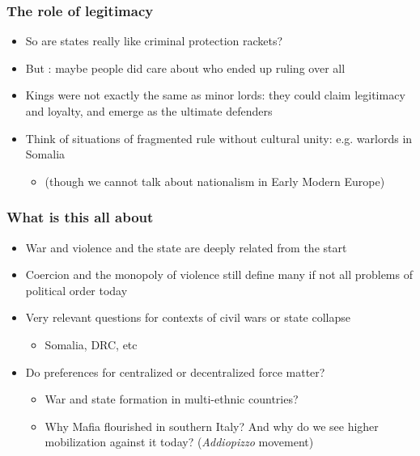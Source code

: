 \documentclass[aspectratio=43, handout]{beamer}
\begin{document}
\begin{frame}
\frametitle{The role of legitimacy}
\centering

\begin{itemize}
  \item So are states really like criminal protection rackets? %
  \item But : maybe people did care about who ended up ruling over all
  \item Kings were not exactly the same as minor lords: they could claim legitimacy and loyalty, and emerge as the ultimate defenders
  \item Think of situations of fragmented rule without cultural unity: e.g. warlords in Somalia
  \begin{itemize}
    \item (though we cannot talk about nationalism in Early Modern Europe)
  \end{itemize}
\end{itemize}

\end{frame}

\begin{frame}
\frametitle{What is this all about}
\centering

\begin{itemize}
  \item War and violence and the state are deeply related from the start
  \item Coercion and the monopoly of violence still define many if not all problems of political order today
  \item<2-> Very relevant questions for contexts of civil wars or state collapse
  \begin{itemize}
    \item Somalia, DRC, etc
  \end{itemize}
  \item<2-> Do preferences for centralized or decentralized force matter?
  \begin{itemize}[<+->]
    \item War and state formation in multi-ethnic countries?
    \item Why Mafia flourished in southern Italy? And why do we see higher mobilization against it today? (\textit{Addiopizzo} movement)
  \end{itemize}
\end{itemize}

\end{frame}
\end{document}
